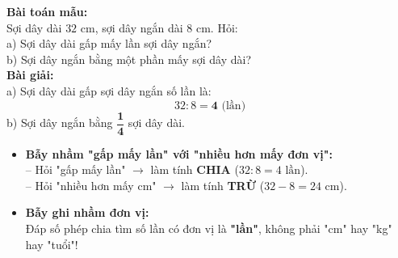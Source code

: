 \documentclass[11pt,a4paper]{article}
\begin{document}
\vspace{-2.5mm}
\noindent
\begin{minipage}[t]{0.49\textwidth}\vspace{0pt}
\begin{tcolorbox}[
  enhanced,
  colback=green!4!white,
  colframe=green!60!black,
  arc=2mm, boxrule=0.8pt,
  left=2mm, right=2mm, top=1.8mm, bottom=1.8mm,
  title={\footnotesize\bfseries\color{white}\faCheckCircle\ Ví dụ thực hành chuẩn mực}
]
{\footnotesize
\textbf{Bài toán mẫu:}\\
Sợi dây dài $32\text{ cm}$, sợi dây ngắn dài $8\text{ cm}$. Hỏi:\\
a) Sợi dây dài gấp mấy lần sợi dây ngắn?\\
b) Sợi dây ngắn bằng một phần mấy sợi dây dài?\\
\textbf{Bài giải:}\\
a) Sợi dây dài gấp sợi dây ngắn số lần là:
$$32 : 8 = \mathbf{4}\text{ (lần)}$$
b) Sợi dây ngắn bằng $\mathbf{\dfrac{1}{4}}$ sợi dây dài.
}
\end{tcolorbox}
\end{minipage}
\hfill
\begin{minipage}[t]{0.49\textwidth}\vspace{0pt}
\begin{tcolorbox}[
  enhanced,
  colback=red!4!white,
  colframe=red!70!black,
  arc=2mm, boxrule=0.8pt,
  left=2mm, right=2mm, top=1.8mm, bottom=1.8mm,
  title={\footnotesize\bfseries\color{white}\faExclamationTriangle\ Mẹo tránh bẫy trắc nghiệm}
]
{\footnotesize
\begin{itemize}\setlength{\itemsep}{1.5pt}\setlength{\leftskip}{-2.5mm}
  \item \textbf{Bẫy nhầm "gấp mấy lần" với "nhiều hơn mấy đơn vị":}\\
  -- Hỏi "gấp mấy lần" $\to$ làm tính \textbf{CHIA} ($32 : 8 = 4\text{ lần}$).\\
  -- Hỏi "nhiều hơn mấy cm" $\to$ làm tính \textbf{TRỪ} ($32 - 8 = 24\text{ cm}$).
  \item \textbf{Bẫy ghi nhầm đơn vị:}\\
  Đáp số phép chia tìm số lần có đơn vị là \textbf{"lần"}, không phải "cm" hay "kg" hay "tuổi"!
\end{itemize}
}
\end{tcolorbox}
\end{minipage}
\end{document}
